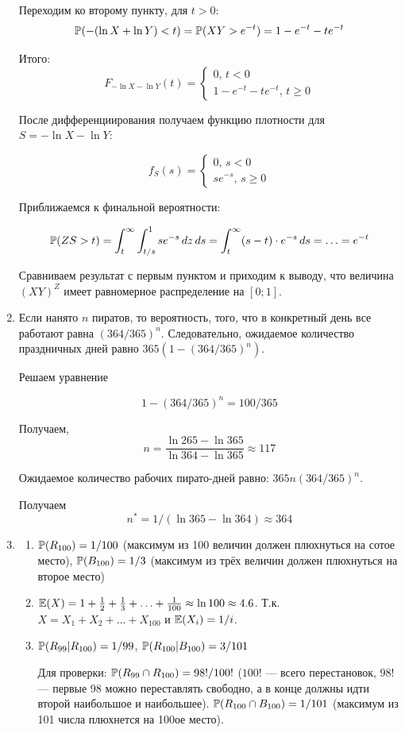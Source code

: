 \begin{enumerate}
Переходим ко второму пункту, для $t>0$:
\[
\P(-(\ln X + \ln Y) < t)=\P(XY > e^{-t})= 1-e^{-t} -t e^{-t}
\]

Итого:
\[
F_{-\ln X - \ln Y}(t)=\begin{cases}
0, \, t < 0 \\
1-e^{-t} - te^{-t}, \, t \geq 0
\end{cases}
\]

После дифференциирования получаем функцию плотности для $S=-\ln X - \ln Y$:

\[
f_S(s)=\begin{cases}
0, \, s < 0 \\
se^{-s}, \, s \geq 0
\end{cases}
\]

Приближаемся к финальной вероятности:

\[
\P(ZS > t)= \int_t^{\infty} \int_{t/s}^1  se^{-s} \, dz\, ds=
\int_t^{\infty} (s-t)\cdot e^{-s} \, ds= \ldots = e^{-t}
\]

Сравниваем результат с первым пунктом и приходим к выводу, что величина $(XY)^Z$ имеет равномерное распределение на $[0;1]$.

\item Если нанято $n$ пиратов, то вероятность, того, что в конкретный день все работают равна $(364/365)^n$. Следовательно, ожидаемое количество праздничных дней равно $365(1-(364/365)^n)$.

Решаем уравнение

\[
1-(364/365)^n=100/365
\]

Получаем,
\[
n=\frac{\ln 265- \ln 365}{ \ln 364 - \ln 365}\approx 117
\]

Ожидаемое количество рабочих пирато-дней равно: $365n(364/365)^n$.

Получаем
\[
n^*=1/(\ln 365 - \ln 364)\approx 364
\]

\item
\begin{enumerate}
\item $\P(R_{100})=1/100$ (максимум из 100 величин должен плюхнуться на сотое место), $\P(B_{100})=1/3$ (максимум из трёх величин должен плюхнуться на второе место)
\item $\E(X)=1+\frac{1}{2} + \frac{1}{3}+\ldots + \frac{1}{100}\approx \ln 100 \approx 4.6$. Т.к. $X=X_1+X_2+\ldots + X_{100}$ и $\E(X_i)=1/i$.
\item $\P(R_{99} | R_{100})=1/99$, $\P(R_{100}|B_{100})=3/101$

Для проверки: $\P(R_{99} \cap R_{100})=98!/100!$ ($100!$ — всего перестановок, $98!$ — первые 98 можно переставлять свободно, а в конце должны идти второй наибольшое и наибольшее). $\P(R_{100} \cap B_{100})=1/101$ (максимум из 101 числа плюхнется на 100ое место).
\end{enumerate}


\end{enumerate}
